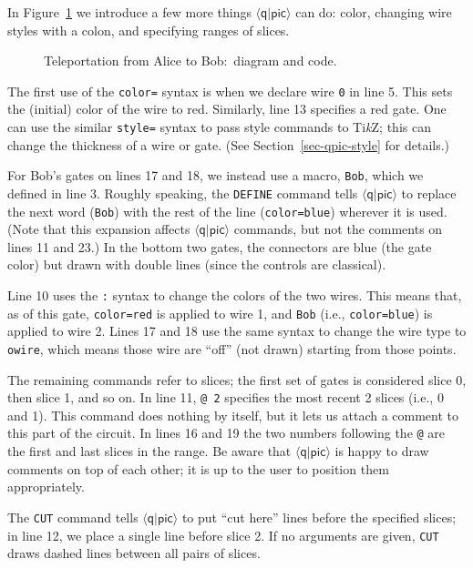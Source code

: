 \documentclass[twoside,12pt]{article}
\newcommand{\qpic}{$\langle\mathsf{q}|\mathsf{pic}\rangle$\xspace}
\newcommand{\TikZ}{Ti\emph{k}Z\xspace}
\begin{document}
In Figure~\ref{fig-teleport} we introduce a few more things \qpic can do: color, changing wire styles with a colon, and specifying ranges of slices.

\begin{figure}[h!] 
\begin{center}

\begin{minipage}{5in}

\end{minipage}
\end{center}
\caption{Teleportation from {\color{red}Alice} to {\color{blue}Bob}:\ diagram and code.}
\label{fig-teleport}
\end{figure}

The first use of the {\tt color=} syntax is when we declare wire {\tt 0}
in line 5.  This sets the (initial) color of the wire to red.
Similarly, line 13 specifies a red gate.  One can use the similar {\tt style=}
syntax to pass style commands to \TikZ; this can change the
thickness of a wire or gate.  (See Section~\ref{sec-qpic-style} for details.)

For Bob's gates on lines 17 and 18, we instead use a macro, {\tt Bob},
which we defined in line 3.  Roughly speaking, the
{\tt DEFINE} command tells \qpic to replace the next word ({\tt Bob})
with the rest of the line ({\tt color=blue}) wherever it is used.  (Note that
this expansion affects \qpic commands, but not the comments on lines 11 and 23.)
In the bottom two gates, the connectors are blue (the gate color) but drawn
with double lines (since the controls are classical).

Line 10 uses the {\tt :} syntax to change the colors of the two wires.  This
means that, as of this gate, {\tt color=red} is applied to wire 1, and
{\tt Bob} (i.e., {\tt color=blue}) is applied to wire 2.  Lines 17 and 18 use
the same syntax to change the wire type to {\tt owire}, which means those
wire are ``off'' (not drawn) starting from those points.

The remaining commands refer to slices; the first set of gates is
considered slice 0, then slice 1, and so on.  In line 11,
{\tt @ 2} specifies the most recent 2 slices (i.e., 0 and 1).  This
command does nothing by itself, but it lets us attach a comment to this
part of the circuit.  In lines 16 and 19 the two numbers following the
{\tt @} are the first and last slices in the range.  Be aware that
\qpic is happy to draw comments on top of each other; it is up to
the user to position them appropriately.

The {\tt CUT} command tells \qpic to put ``cut here'' lines before
the specified slices; in line 12, we place a single line before
slice 2.  If no arguments are given, {\tt CUT} draws dashed lines
between all pairs of slices.
\end{document}
